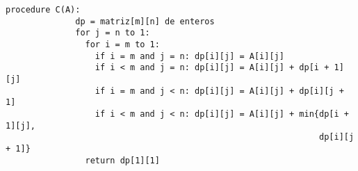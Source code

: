 \documentclass[spanish]{beamer}
\begin{document}
    \newsavebox{\algoritmoBottomUp}
    \begin{lrbox}{\algoritmoBottomUp}
        \begin{lstlisting}[gobble=12]
            procedure C(A):
              dp = matriz[m][n] de enteros
              for j = n to 1:
                for i = m to 1:
                  if i = m and j = n: dp[i][j] = A[i][j]
                  if i < m and j = n: dp[i][j] = A[i][j] + dp[i + 1][j]
                  if i = m and j < n: dp[i][j] = A[i][j] + dp[i][j + 1]
                  if i < m and j < n: dp[i][j] = A[i][j] + min{dp[i + 1][j],
                                                               dp[i][j + 1]}
                return dp[1][1]
        \end{lstlisting}
    \end{lrbox}
\end{document}
